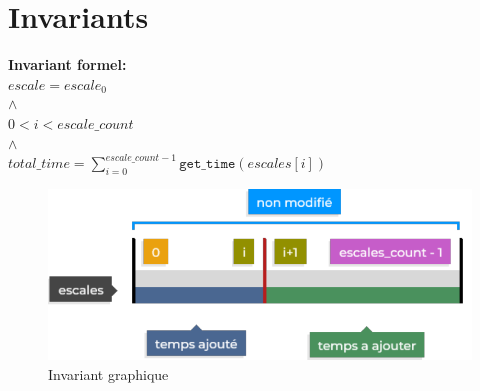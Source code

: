 \section{Invariants}\label{invariants}

\textbf{Invariant formel:} \\
    $escale = escale_0$ \\
    $\land$ \\
    $0 < i < escale\_count$ \\
    $\land$ \\
    $total\_time = \sum_{i=0}^{escale\_count-1} \texttt{get\_time}(escales[i])$

\begin{figure}[h]
    \centering
    \includegraphics[width=1\textwidth]{invariant.pdf}
    \caption{Invariant graphique}
\end{figure}
